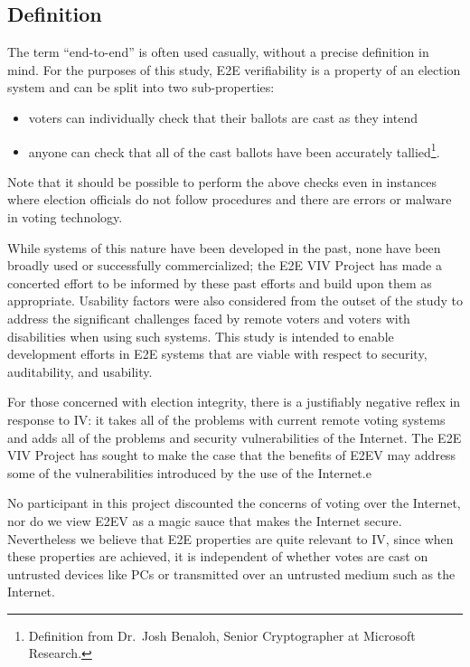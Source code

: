 \subsection{Definition}
\label{sec:definition}

The term ``end-to-end'' is often used casually, without a precise
definition in mind. For the purposes of this study, E2E verifiability
is a property of an election system and can be split into two sub-properties:  
\begin{itemize}
\item voters can individually check that their ballots are cast as they
intend
\item anyone can check that all of the cast ballots have been accurately tallied\footnote{Definition from Dr.~Josh
  Benaloh, Senior Cryptographer at Microsoft Research.}.
\end{itemize}
Note that it should be possible to perform the above checks even in instances where election officials do not follow procedures and there are errors or malware in voting technology. 

While systems of this nature have been developed in the past, none
have been broadly used or successfully commercialized; the E2E VIV
Project has made a concerted effort to be informed by these past
efforts and build upon them as appropriate. Usability factors were
also considered from the outset of the study to address the
significant challenges faced by remote voters and voters with disabilities when using
such systems. This study is intended to enable development efforts in
E2E systems that are viable with respect to security, auditability,
and usability.

For those concerned with election integrity, there is a justifiably
negative reflex in response to IV: it takes all of the problems with
current remote voting systems and adds all of the problems and
security vulnerabilities of the Internet. 
The E2E VIV Project has sought to make the case that 
the benefits of E2EV may address some of the vulnerabilities
introduced by the use of the Internet.e

No participant in this project discounted the concerns of voting over
the Internet, nor do we view E2EV as a magic sauce that makes the
Internet secure. Nevertheless we believe that E2E properties are quite
relevant to IV, since when these properties are achieved, it is independent of whether votes
are cast on untrusted devices like PCs or transmitted over an
untrusted medium such as the Internet.

